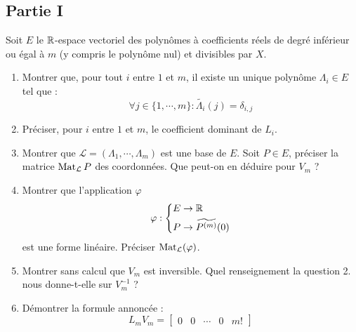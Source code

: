 \subsection*{Partie I}
Soit $E$ le $\mathbb{R}$-espace vectoriel des polynômes à coefficients réels de degré inférieur ou égal à $m$ (y compris le polynôme nul) et divisibles par $X$.
\begin{enumerate}
 \item Montrer que, pour tout $i$ entre $1$ et $m$, il existe un unique polynôme $\Lambda_i\in E$ tel que :
\begin{displaymath}
 \forall j\in \{1,\cdots, m\} : \widetilde{\Lambda_i}(j) = \delta_{i,j}
\end{displaymath}
\item Préciser, pour $i$ entre $1$ et $m$, le coefficient dominant de $L_i$.
\item Montrer que $\mathcal L = (\Lambda_1,\cdots,\Lambda_m)$ est une base de $E$. Soit $P\in E$, préciser la matrice $\operatorname{Mat}_\mathcal L P$ des coordonnées. Que peut-on en déduire pour $V_m$ ?
\item Montrer que l'application $\varphi$
\begin{displaymath}
 \varphi :
\left\lbrace 
\begin{aligned}
 E &\rightarrow \mathbb{R} \\
 P &\rightarrow \widetilde{P^{(m)}}(0)
\end{aligned}
\right. 
\end{displaymath}
est une forme linéaire. Préciser $\operatorname{Mat}_\mathcal L (\varphi)$.
\item Montrer sans calcul que $V_m$ est inversible. Quel renseignement la question 2. nous donne-t-elle sur $V_m^{-1}$ ?
\item Démontrer la formule annoncée :
\begin{displaymath}
 L_m V_m =
\begin{bmatrix}
 0 & 0 & \cdots & 0 & m!
\end{bmatrix}
\end{displaymath}
\end{enumerate}

